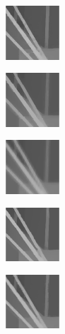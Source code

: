 \documentclass[preprint,10pt,5p,times,twocolumn]{elsarticle}
\begin{document}
\begin{figure}[t]
\begin{center}
\vspace{-0.3cm}
\begin{subfigure}[b]{0.136\linewidth}
    \includegraphics[height = 2cm,width=\linewidth]{cmp_art_8X_JG_part.png}
    \label{fig:}
\end{subfigure}
\begin{subfigure}[b]{0.136\linewidth}
    \includegraphics[height = 2cm,width=\linewidth]{cmp_art_8X_NLA_part.png}
    \label{fig:} %
\end{subfigure}
\begin{subfigure}[b]{0.136\linewidth}
    \includegraphics[height = 2cm,width=\linewidth]{cmp_art_8X_JBL_part.png}
    \label{fig:}
\end{subfigure}
\begin{subfigure}[b]{0.136\linewidth}
    \includegraphics[height = 2cm,width=\linewidth]{cmp_art_8X_AR_part.png}
    \label{fig:} %
\end{subfigure}
\begin{subfigure}[b]{0.136\linewidth}
    \includegraphics[height = 2cm,width=\linewidth]{cmp_art_8X_ST_part.png}
    \label{fig:}

\end{subfigure}
\end{center}
\end{figure}
\end{document}
